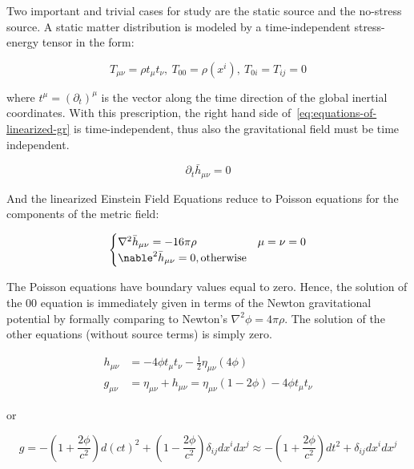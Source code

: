 Two important and trivial cases for study are the static source and the no-stress source.
A static matter distribution is modeled by a time-independent stress-energy tensor in the form:

\begin{equation}
    T_{\mu\nu} = \rho t_{\mu}t_{\nu}, \ T_{00} = \rho(x^i), \ T_{0i}= T_{ij} = 0\label{eq:static-source}
\end{equation}

where $t^\mu = (\partial_t)^\mu$ is the vector along the time direction of the global inertial coordinates.
With this prescription, the right hand side of~\ref{eq:equations-of-linearized-gr} is time-independent, thus also the gravitational field must be time independent.

\begin{equation}
    \partial_t\bar h_{\mu\nu} = 0\label{eq:time-independent-metric}
\end{equation}

And the linearized Einstein Field Equations reduce to Poisson equations for the components of the metric field:

\begin{equation}
    \begin{cases}
        \nabla^2\bar h_{\mu\nu} = -16\pi\rho & \mu=\nu=0\\
        \nable^2\bar h_{\mu\nu} = 0, \text{otherwise}
    \end{cases}\label{eq:linearized-answers-static-source}
\end{equation}

The Poisson equations have boundary values equal to zero.
Hence, the solution of the $00$ equation is immediately given in terms of the Newton gravitational potential by formally comparing to Newton's $\nabla^2\phi = 4\pi\rho$.
The solution of the other equations (without source terms) is simply zero.

\begin{align}
    h_{\mu\nu} &= -4\phi t_{\mu} t_{\nu} -\frac12 \eta_{\mu\nu}(4\phi)\\
    g_{\mu\nu} &= \eta_{\mu\nu} + h_{\mu\nu} = \eta_{\mu\nu}\left(1-2\phi \right) - 4\phi t_{\mu}t_{\nu}
\end{align}

or

\begin{equation}
    g = -\left(1 + \frac{2\phi}{c^2}\right)d(ct)^2 + \left(
                                                         1-\frac{2\phi}{c^2}
    \right)\delta_{ij}dx^i dx^j \approx -(1+\frac{2\phi}{c^2})dt^2 +\delta_{ij}dx^i dx^j\label{eq:static-source-solution}
\end{equation}

